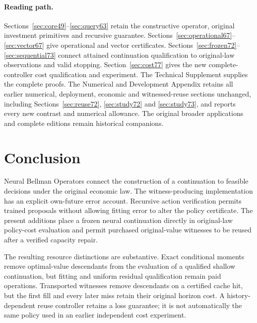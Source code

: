 \documentclass[ecta,nameyear,draft]{econsocart}
\begin{document}
\paragraph{Reading path.}
Sections~\ref{sec:core49}--\ref{sec:query63} retain the constructive operator, original investment primitives and recursive guarantee. Sections~\ref{sec:operational67}--\ref{sec:vector67} give operational and vector certificates. Sections~\ref{sec:frozen72}--\ref{sec:sequential73} connect attained continuation qualification to original-law observations and valid stopping. Section~\ref{sec:cost77} gives the new complete-controller cost qualification and experiment. The Technical Supplement supplies the complete proofs. The Numerical and Development Appendix retains all earlier numerical, deployment, economic and witnessed-reuse sections unchanged, including Sections~\ref{sec:reuse72}, \ref{sec:study72} and \ref{sec:study73}, and reports every new contrast and numerical allowance. The original broader applications and complete editions remain historical companions.










\section{Conclusion}\label{sec:conclusion65}
Neural Bellman Operators connect the construction of a continuation to feasible decisions under the original economic law. The witness-producing implementation has an explicit own-future error account. Recursive action verification permits trained proposals without allowing fitting error to alter the policy certificate. The present additions place a frozen neural continuation directly in original-law policy-cost evaluation and permit purchased original-value witnesses to be reused after a verified capacity repair.

The resulting resource distinctions are substantive. Exact conditional moments remove optimal-value descendants from the evaluation of a qualified shallow continuation, but fitting and uniform residual qualification remain paid operations. Transported witnesses remove descendants on a certified cache hit, but the first fill and every later miss retain their original horizon cost. A history-dependent reuse controller retains a loss guarantee; it is not automatically the same policy used in an earlier independent cost experiment.
\end{document}
